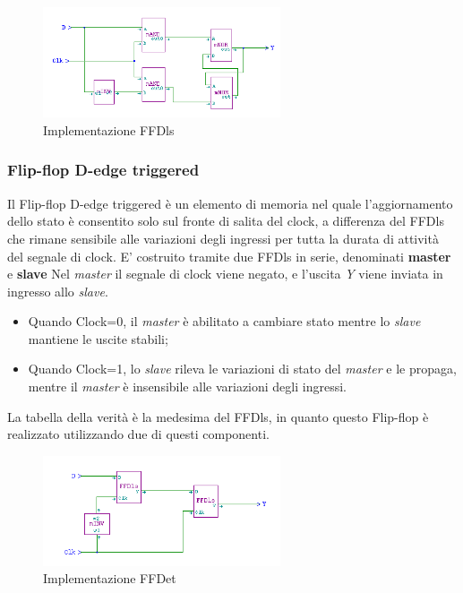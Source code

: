\documentclass[10pt]{article}
\begin{document}
\begin{itemize}
    \begin{figure}[ht]
    \begin{minipage}[b]{0.4\textwidth}
    \centering
    \includegraphics[width=70mm]{ffdls}
    \caption{Implementazione FFDls}
    \label{ }
    \end{minipage}
    \end{figure}


\subsubsection{Flip-flop D-edge triggered}
Il Flip-flop D-edge triggered è un elemento di memoria nel quale l'aggiornamento dello stato è consentito solo sul fronte di salita del clock, a differenza del FFDls che rimane sensibile
alle variazioni degli ingressi per tutta la durata di attività del segnale di clock. E' costruito tramite due FFDls in serie, denominati \textbf{master} e \textbf{slave}
Nel \emph{master} il segnale di clock viene negato, e l'uscita \emph{Y} viene inviata in ingresso allo \emph{slave}. 

\begin{itemize}
    \item Quando Clock=0, il \emph{master} è abilitato a cambiare stato mentre lo \emph{slave} mantiene le uscite stabili;
    \item Quando Clock=1, lo \emph{slave} rileva le variazioni di stato del \emph{master} e le propaga, mentre il \emph{master} è insensibile alle variazioni degli ingressi.
\end{itemize}

La tabella della verità è la medesima del FFDls, in quanto questo Flip-flop è realizzato utilizzando due di questi componenti.

\begin{figure}[H]
    \begin{minipage}[b]{\textwidth}
    \centering
    \includegraphics[width=70mm]{ffdet}
    \caption{Implementazione FFDet}
    \label{ }
    \end{minipage}
    \end{figure}


\end{itemize}
\end{document}
